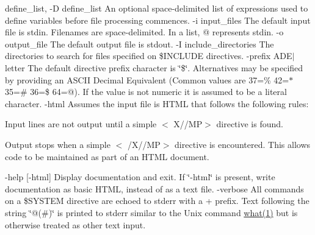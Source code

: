 define\+\_\+list, -\/D define\+\_\+list An optional space-\/delimited list of expressions used to define variables before file processing commences. -\/i input\+\_\+files The default input file is stdin. Filenames are space-\/delimited. In a list, @ represents stdin. -\/o output\+\_\+file The default output file is stdout. -\/I include\+\_\+directories The directories to search for files specified on \$\+I\+N\+C\+L\+U\+DE directives. -\/prefix A\+D\+E$\vert$letter The default directive prefix character is \char`\"{}\$\char`\"{}. Alternatives may be specified by providing an A\+S\+C\+II Decimal Equivalent (Common values are 37=\% 42=$\ast$ 35=\# 36=\$ 64=@). If the value is not numeric it is assumed to be a literal character. -\/html Assumes the input file is H\+T\+ML that follows the following rules\+:
\begin{DoxyEnumerate}
\item Input lines are not output until a simple $<$ X\textquotesingle{}//\textquotesingle{}MP$>$ directive is found.
\item Output stops when a simple $<$ /X\textquotesingle{}//\textquotesingle{}MP$>$ directive is encountered. This allows code to be maintained as part of an H\+T\+ML document.
\end{DoxyEnumerate}

-\/help \mbox{[}-\/html\mbox{]} Display documentation and exit. If \char`\"{}-\/html\char`\"{} is present, write documentation as basic H\+T\+ML, instead of as a text file. -\/verbose All commands on a \$\+S\+Y\+S\+T\+EM directive are echoed to stderr with a + prefix. Text following the string \char`\"{}@(\#)\char`\"{} is printed to stderr similar to the Unix command \hyperlink{what__overview_81_8txt_a8cdf8efd1b900d6dce77a3f97edb2216}{what(1)} but is otherwise treated as other text input.

